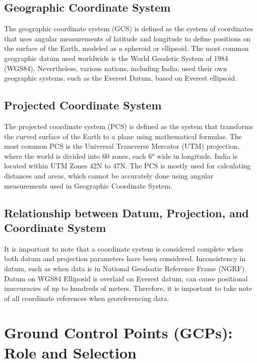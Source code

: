 \documentclass[
  11pt,
  letterpaper,
]{book}
\begin{document}
\subsection{Geographic Coordinate
System}\label{geographic-coordinate-system}

The geographic coordinate system (GCS) is defined as the system of
coordinates that uses angular measurements of latitude and longitude to
define positions on the surface of the Earth, modeled as a spheroid or
ellipsoid. The most common geographic datum used worldwide is the World
Geodetic System of 1984 (WGS84). Nevertheless, various nations,
including India, used their own geographic systems, such as the Everest
Datum, based on Everest ellipsoid.

\subsection{Projected Coordinate
System}\label{projected-coordinate-system}

The projected coordinate system (PCS) is defined as the system that
transforms the curved surface of the Earth to a plane using mathematical
formulas. The most common PCS is the Universal Transverse Mercator (UTM)
projection, where the world is divided into 60 zones, each 6° wide in
longitude. India is located within UTM Zones 42N to 47N. The PCS is
mostly used for calculating distances and areas, which cannot be
accurately done using angular measurements used in Geographic Coordinate
System.

\subsection{Relationship between Datum, Projection, and Coordinate
System}\label{relationship-between-datum-projection-and-coordinate-system}

It is important to note that a coordinate system is considered complete
when both datum and projection parameters have been considered.
Inconsistency in datum, such as when data is in National Geodeatic
Reference Frame (NGRF) Datum on WGS84 Elliposid is overlaid on Everest
datum, can cause positional inaccuracies of up to hundreds of meters.
Therefore, it is important to take note of all coordinate references
when georeferencing data.

\section{Ground Control Points (GCPs): Role and
Selection}\label{ground-control-points-gcps-role-and-selection}
\end{document}
